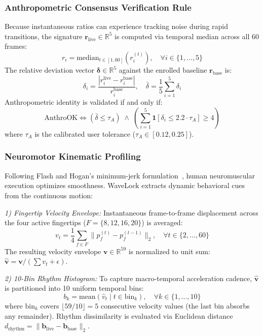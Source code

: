 \documentclass[conference]{IEEEtran}
\begin{document}
\subsubsection{Anthropometric Consensus Verification Rule}
Because instantaneous ratios can experience tracking noise during rapid transitions, the signature $\mathbf{r}_{\text{live}} \in \mathbb{R}^5$ is computed via temporal median across all 60 frames:
\begin{equation}
r_i = \text{median}_{t \in [1, 60]} \left( r_i^{(t)} \right), \quad \forall i \in \{1, \ldots, 5\}
\end{equation}
The relative deviation vector $\boldsymbol{\delta} \in \mathbb{R}^5$ against the enrolled baseline $\mathbf{r}_{\text{base}}$ is:
\begin{equation}
\delta_i = \frac{|r_i^{\text{live}} - r_i^{\text{base}}|}{r_i^{\text{base}}}, \quad \bar{\delta} = \frac{1}{5}\sum_{i=1}^{5} \delta_i
\end{equation}
Anthropometric identity is validated if and only if:
\begin{equation}
\text{AnthroOK} \iff (\bar{\delta} \le \tau_A) \;\wedge\; \left( \sum_{i=1}^{5} \mathbf{1}[\delta_i \le 2.2 \cdot \tau_A] \ge 4 \right)
\label{eq:anthro_rule}
\end{equation}
where $\tau_A$ is the calibrated user tolerance ($\tau_A \in [0.12, 0.25]$).

\subsubsection{Neuromotor Kinematic Profiling}
Following Flash and Hogan's minimum-jerk formulation~\cite{flash1985}, human neuromuscular execution optimizes smoothness. WaveLock extracts dynamic behavioral cues from the continuous motion:

\textit{1) Fingertip Velocity Envelope:} Instantaneous frame-to-frame displacement across the four active fingertips ($F = \{8, 12, 16, 20\}$) is averaged:
\begin{equation}
v_t = \frac{1}{4} \sum_{f \in F} \|p_f^{(t)} - p_f^{(t-1)}\|_2, \quad \forall t \in \{2, \ldots, 60\}
\end{equation}
The resulting velocity envelope $\mathbf{v} \in \mathbb{R}^{59}$ is normalized to unit sum: $\hat{\mathbf{v}} = \mathbf{v} / (\sum v_t + \epsilon)$.

\textit{2) 10-Bin Rhythm Histogram:} To capture macro-temporal acceleration cadence, $\hat{\mathbf{v}}$ is partitioned into 10 uniform temporal bins:
\begin{equation}
b_k = \text{mean}\left(\hat{v}_t \mid t \in \text{bin}_k\right), \quad \forall k \in \{1, \ldots, 10\}
\end{equation}
where $\text{bin}_k$ covers $\lfloor 59/10 \rfloor = 5$ consecutive velocity values (the last bin absorbs any remainder). Rhythm dissimilarity is evaluated via Euclidean distance $d_{\text{rhythm}} = \|\mathbf{b}_{\text{live}} - \mathbf{b}_{\text{base}}\|_2$.
\end{document}
